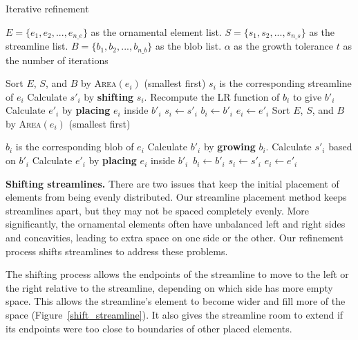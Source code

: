 \begin{algorithm}[h!] 
\caption{Iterative refinement} 
\label{iterative_refinement_algorithm}
\begin{algorithmic} 
\REQUIRE $E = \{ e_{1}, e_{2},... , e_{n\text{\_}e} \}$ as the ornamental element list. 
\REQUIRE $S = \{ s_{1}, s_{2},... , s_{n\text{\_}s} \}$ as the streamline list.
\REQUIRE $B = \{ b_{1}, b_{2},... , b_{n\text{\_}b} \}$ as the blob list.
\REQUIRE $\alpha$ as the growth tolerance
\REQUIRE $t$ as the number of iterations

  \STATE Sort $E$, $S$, and $B$ by \textsc{Area}$(e_{i})$ (smallest first)
  	\STATE $s_{i}$ is the corresponding streamline of $e_{i}$
    \STATE Calculate $s'_{i}$ by \textbf{shifting} $s_{i}$.
    \STATE Recompute the LR function of $b_{i}$ to give $b'_{i}$
    \STATE Calculate $e'_{i}$ by \textbf{placing} $e_{i}$ inside $b'_{i}$
        \STATE $s_{i} \leftarrow s'_{i}$
        \STATE $b_{i} \leftarrow b'_{i}$
    	\STATE $e_{i} \leftarrow e'_{i}$ 
    \ENDIF
  \ENDFOR
  \STATE Sort $E$, $S$, and $B$ by \textsc{Area}$(e_{i})$ (smallest first)

  	\STATE $b_{i}$ is the corresponding blob of $e_{i}$
    \STATE Calculate $b'_{i}$ by \textbf{growing} $b_{i}$.
    \STATE Calculate $s'_{i}$ based on $b'_{i}$ 
    \STATE Calculate $e'_{i}$ by \textbf{placing} $e_{i}$ inside $b'_{i}$\
    \STATE $b_{i} \leftarrow b'_{i}$
        \STATE $s_{i} \leftarrow s'_{i}$
    	\STATE $e_{i} \leftarrow e'_{i}$ 
    \ENDIF
  \ENDFOR

\ENDFOR
\end{algorithmic}
\end{algorithm}

\textbf{Shifting streamlines.}
There are two issues that keep the initial placement of elements from being
evenly
distributed. Our streamline placement method keeps streamlines apart,
but they may not be spaced completely evenly. More significantly, the
ornamental elements often have unbalanced left and right sides and concavities,
leading to extra space on one side or the other.  Our refinement process
shifts streamlines to address these problems.

The shifting process allows the endpoints of the streamline to move to the
left or the right relative to the streamline, depending on which side has more empty space.
This allows the streamline's element to become wider and fill more of the space
(Figure~\ref{shift_streamline}). It also gives the streamline room to
extend if its endpoints were too close to boundaries of other placed
elements.

